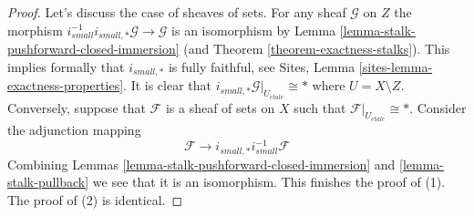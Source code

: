 \documentclass[10pt,a4paper]{amsart}
\theoremstyle{plain}
\theoremstyle{definition}
\theoremstyle{remark}
\numberwithin{equation}{subsection}
\def\etale{{\acute{e}tale}}
\begin{document}
\begin{proof}
Let's discuss the case of sheaves of sets.
For any sheaf $\mathcal{G}$ on $Z$ the morphism
$i_{small}^{-1}i_{small, *}\mathcal{G} \to \mathcal{G}$
is an isomorphism by
Lemma \ref{lemma-stalk-pushforward-closed-immersion}
(and
Theorem \ref{theorem-exactness-stalks}).
This implies formally that $i_{small, *}$ is fully faithful, see
Sites, Lemma \ref{sites-lemma-exactness-properties}.
It is clear that $i_{small, *}\mathcal{G}|_{U_\etale} \cong *$
where $U = X \setminus Z$. Conversely, suppose that $\mathcal{F}$
is a sheaf of sets on $X$ such that $\mathcal{F}|_{U_\etale} \cong *$.
Consider the adjunction mapping
$$
\mathcal{F} \longrightarrow i_{small, *}i_{small}^{-1}\mathcal{F}
$$
Combining
Lemmas \ref{lemma-stalk-pushforward-closed-immersion} and
\ref{lemma-stalk-pullback}
we see that it is an isomorphism. This finishes the proof of (1).
The proof of (2) is identical.
\end{proof}
\end{document}
